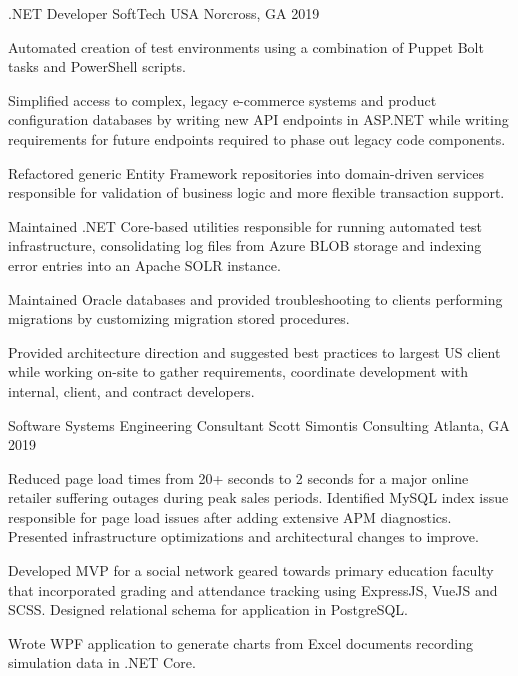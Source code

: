 \begin{cventries}
  \cventry
    {.NET Developer} %
    {SoftTech USA} %
    {Norcross, GA} %
    {2019} %
    {
      \begin{cvitems} %
        \item {Automated creation of test environments using a combination of Puppet Bolt tasks and PowerShell scripts.}
        \item {Simplified access to complex, legacy e-commerce systems and product configuration databases by writing new API endpoints in ASP.NET while writing requirements for future endpoints required to phase out legacy code components.}
        \item {Refactored generic Entity Framework repositories into domain-driven services responsible for validation of business logic and more flexible transaction support.}
        \item {Maintained .NET Core-based utilities responsible for running automated test infrastructure, consolidating log files from Azure BLOB storage and indexing error entries into an Apache SOLR instance.}
        \item {Maintained Oracle databases and provided troubleshooting to clients performing migrations by customizing migration stored procedures.}
        \item {Provided architecture direction and suggested best practices to largest US client while working on-site to gather requirements, coordinate development with internal, client, and contract developers.}
      \end{cvitems}
    }

  \cventry
    {Software Systems Engineering Consultant} %
    {Scott Simontis Consulting} %
    {Atlanta, GA} %
    {2019} %
    {
      \begin{cvitems} %
        \item {Reduced page load times from 20+ seconds to 2 seconds for a major online retailer suffering outages during peak sales periods. Identified MySQL index issue responsible for page load issues after adding extensive APM diagnostics. Presented infrastructure optimizations and architectural changes to improve.}
        \item {Developed MVP for a social network geared towards primary education faculty that incorporated grading and attendance tracking using ExpressJS, VueJS and SCSS. Designed relational schema for application in PostgreSQL.}
        \item {Wrote WPF application to generate charts from Excel documents recording simulation data in .NET Core.}
      \end{cvitems}
    }


\end{cventries}
